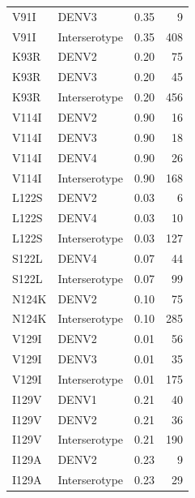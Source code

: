 \documentclass[11pt,oneside,letterpaper]{article}
\begin{document}
\begin{centering}
\begin{table}[ht]
{\begin{tabular}{llrr}
                            V91I &          DENV3 &  0.35 &      9 \\
                            V91I &  Interserotype &  0.35 &    408 \\
                            K93R &          DENV2 &  0.20 &     75 \\
                            K93R &          DENV3 &  0.20 &     45 \\
                            K93R &  Interserotype &  0.20 &    456 \\
                           V114I &          DENV2 &  0.90 &     16 \\
                           V114I &          DENV3 &  0.90 &     18 \\
                           V114I &          DENV4 &  0.90 &     26 \\
                           V114I &  Interserotype &  0.90 &    168 \\
                           L122S &          DENV2 &  0.03 &      6 \\
                           L122S &          DENV4 &  0.03 &     10 \\
                           L122S &  Interserotype &  0.03 &    127 \\
                           S122L &          DENV4 &  0.07 &     44 \\
                           S122L &  Interserotype &  0.07 &     99 \\
                           N124K &          DENV2 &  0.10 &     75 \\
                           N124K &  Interserotype &  0.10 &    285 \\
                           V129I &          DENV2 &  0.01 &     56 \\
                           V129I &          DENV3 &  0.01 &     35 \\
                           V129I &  Interserotype &  0.01 &    175 \\
                           I129V &          DENV1 &  0.21 &     40 \\
                           I129V &          DENV2 &  0.21 &     36 \\
                           I129V &  Interserotype &  0.21 &    190 \\
                           I129A &          DENV2 &  0.23 &      9 \\
                           I129A &  Interserotype &  0.23 &     29 \\

\end{tabular}}
\end{table}
\end{centering}
\end{document}
